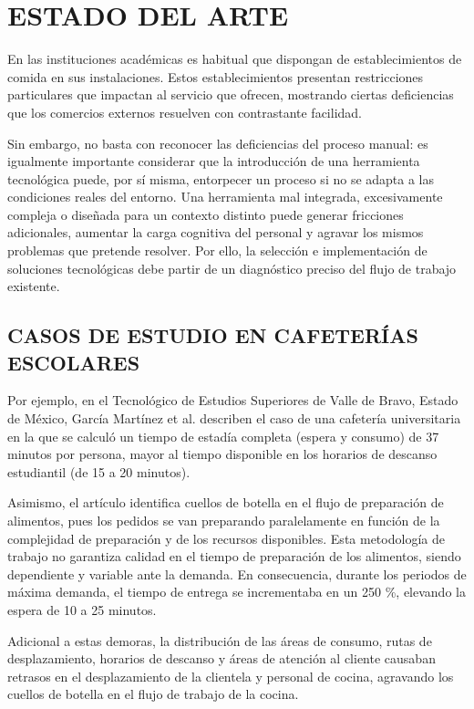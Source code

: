 
\chapter{ESTADO DEL ARTE}

En las instituciones académicas es habitual que dispongan de establecimientos de comida en sus instalaciones. Estos establecimientos presentan restricciones particulares que impactan al servicio que ofrecen, mostrando ciertas deficiencias que los comercios externos resuelven con contrastante facilidad. 

Sin embargo, no basta con reconocer las deficiencias del proceso manual: es igualmente importante considerar que la introducción de una herramienta tecnológica puede, por sí misma, entorpecer un proceso si no se adapta a las condiciones reales del entorno. Una herramienta mal integrada, excesivamente compleja o diseñada para un contexto distinto puede generar fricciones adicionales, aumentar la carga cognitiva del personal y agravar los mismos problemas que pretende resolver. Por ello, la selección e implementación de soluciones tecnológicas debe partir de un diagnóstico preciso del flujo de trabajo existente.

\section{CASOS DE ESTUDIO EN CAFETERÍAS ESCOLARES}

Por ejemplo, en el Tecnológico de Estudios Superiores de Valle de Bravo, Estado de México, García Martínez et al. \cite{garcia2024estrategia} describen el caso de una cafetería universitaria en la que se calculó un tiempo de estadía completa (espera y consumo) de 37 minutos por persona, mayor al tiempo disponible en los horarios de descanso estudiantil (de 15 a 20 minutos). 

Asimismo, el artículo identifica cuellos de botella en el flujo de preparación de alimentos, pues los pedidos se van preparando paralelamente en función de la complejidad de preparación y de los recursos disponibles. Esta metodología de trabajo no garantiza calidad en el tiempo de preparación de los alimentos, siendo dependiente y variable ante la demanda. En consecuencia, durante los periodos de máxima demanda, el tiempo de entrega se incrementaba en un 250 \%, elevando la espera de 10 a 25 minutos. 

Adicional a estas demoras, la distribución de las áreas de consumo, rutas de desplazamiento, horarios de descanso y áreas de atención al cliente causaban retrasos en el desplazamiento de la clientela y personal de cocina, agravando los cuellos de botella en el flujo de trabajo de la cocina. 

